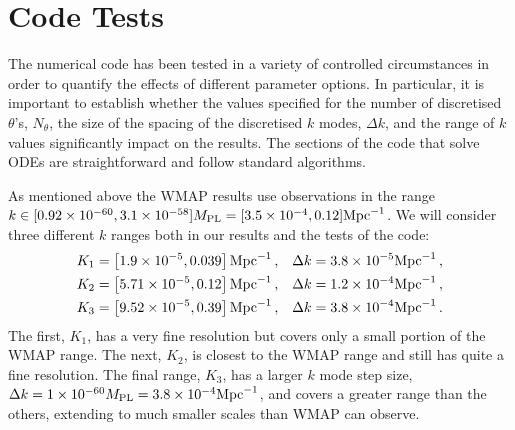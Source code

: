 \section{Code Tests}
\label{sec:tests-num}


The numerical code has been tested in a variety of controlled
circumstances in order to quantify the effects of different parameter options. In
particular, it is important to establish whether the values
specified for the number of discretised $\theta$'s, $N_\theta$, the size
of the
spacing of the discretised $k$ modes, $\Delta k$, and the range of
$k$ values significantly impact on the results. The sections
of the code that solve ODEs are straightforward and follow standard algorithms.


As mentioned above the WMAP results \cite{Komatsu:2008hk} use
observations in the range $k\in [0.92 \times 10^{-60}, 3.1 \times
  10^{-58}]M_{\mathrm{PL}} = [3.5\times 10^{-4}, 0.12] \mathrm{Mpc}^{-1}$. We will
consider three different $k$ ranges both in our results and the tests
of the code\footnotemark:
%
\begin{align}
\label{eq:Krangedefns}
K_1 &= \left[1.9\times 10^{-5}, 0.039\right]\mathrm{Mpc}^{-1}\,, &\Delta k = 3.8\times 10^{-5}\mathrm{Mpc}^{-1}
\,,\nonumber\\
K_2 &= \left[5.71\times 10^{-5}, 0.12\right]\mathrm{Mpc}^{-1}\,, &\Delta k =
1.2\times 10^{-4}\mathrm{Mpc}^{-1}\,,
\nonumber\\ 
K_3 &= \left[9.52\times 10^{-5}, 0.39\right]\mathrm{Mpc}^{-1}\,, &\Delta k = 3.8\times 10^{-4}\mathrm{Mpc}^{-1}
\,.
\end{align}
% 
% 
The first, $K_1$, has a very fine resolution but covers only a small portion of the WMAP range. 
The next, $K_2$, is closest to the WMAP range and still has quite a fine resolution. 
The final
range, $K_3$, has a larger $k$ mode step size, $\Delta k = 1\times 10^{-60}M_{\mathrm{PL}} =
3.8\times 10^{-4}\mathrm{Mpc}^{-1}$, and
covers a greater range than the others, extending to much smaller scales than WMAP can observe.

